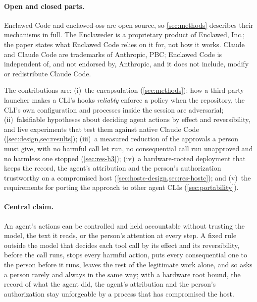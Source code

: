 \documentclass[11pt]{article}
\newcommand{\dev}{Enclaweder}
\newcommand{\cz}{Enclawed Code}
\begin{document}
\paragraph{Open and closed parts.} \cz{} and enclawed-oss
\cite{enclawed-oss} are open source, so \cref{sec:methods} describes
their mechanisms in full. The \dev{} is a proprietary product of
Enclawed, Inc.; the paper states what \cz{} relies on it for, not how it
works. Claude and Claude Code are trademarks of Anthropic, PBC; \cz{} is
independent of, and not endorsed by, Anthropic, and it does not include,
modify or redistribute Claude Code.

The contributions are: (i)~the encapsulation (\cref{sec:methods}): how a
third-party launcher makes a CLI's hooks \emph{reliably} enforce a policy
when the repository, the CLI's own configuration and processes inside
the session are adversarial; (ii)~falsifiable hypotheses about deciding
agent actions by effect and reversibility, and live experiments that test
them against native Claude Code (\cref{sec:design,sec:results});
(iii)~a measured reduction of the approvals a person must give, with no
harmful call let run, no consequential call run unapproved and no
harmless one stopped (\cref{sec:res-h3}); (iv)~a hardware-rooted
deployment that keeps the record, the agent's attribution and the
person's authorization trustworthy on a compromised host
(\cref{sec:hostc-design,sec:res-hostc}); and (v)~the requirements for
porting the approach to other agent CLIs (\cref{sec:portability}).

\paragraph{Central claim.} An agent's actions can be controlled and held
accountable without trusting the model, the text it reads, or the
person's attention at every step. A fixed rule outside the model that
decides each tool call by its effect and its reversibility, before the
call runs, stops every harmful action, puts every consequential one
to the person before it runs, leaves the rest of the legitimate work
alone, and so asks a person rarely and always in the same way; with a
hardware root bound, the record of what the agent did, the agent's
attribution and the person's authorization stay unforgeable by a process
that has compromised the host.
\end{document}
